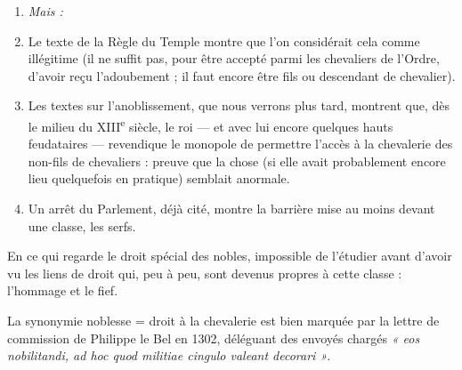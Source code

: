 \documentclass[french,twoside]{book} %
\newlength{\listmod}
\newcommand{\listhead}[1]{\hspace{-1\listmod}\emph{#1}}
\begin{document}
\begin{enumerate}[itemsep=0pt,]
\item[]\listhead{Mais :}
\item  {}
\label{p65} Le texte de la Règle du Temple montre que l’on considérait cela comme illégitime (il ne suffit pas, pour être accepté parmi les chevaliers de l’Ordre, d’avoir reçu l’adoubement ; il faut encore être fils ou descendant de chevalier).
\item Les textes sur l’anoblissement, que nous verrons plus tard, montrent que, dès le milieu du XIII\textsuperscript{e} siècle, le roi — et avec lui encore quelques hauts feudataires — revendique le monopole de permettre l’accès à la chevalerie des non-fils de chevaliers : preuve que la chose (si elle avait probablement encore lieu quelquefois en pratique) semblait anormale.
\item Un arrêt du Parlement, déjà cité, montre la barrière mise au moins devant une classe, les serfs.

\end{enumerate}\noindent En ce qui regarde le droit spécial des nobles, impossible de l’étudier avant d’avoir vu les liens de droit qui, peu à peu, sont devenus propres à cette classe : l’hommage et le fief.\par
La synonymie noblesse = droit à la chevalerie est bien marquée par la lettre de commission de Philippe le Bel en 1302, déléguant des envoyés chargés \emph{« eos nobilitandi, ad hoc quod militiae cingulo valeant decorari »}.
\end{document}
